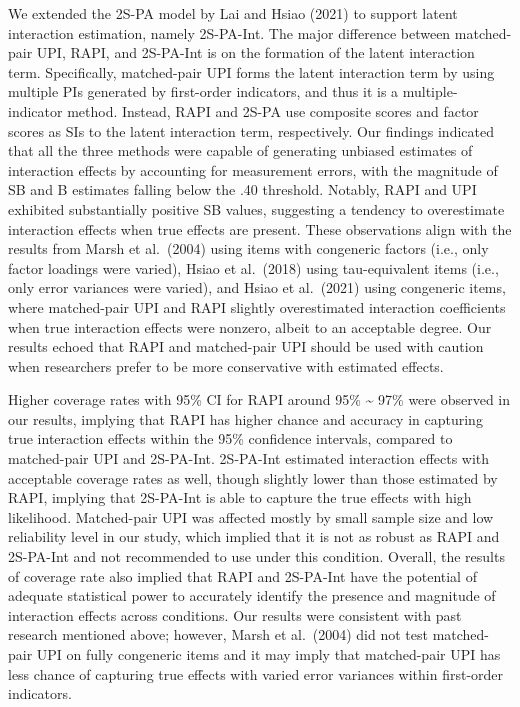 \documentclass[
  man]{apa6}
\begin{document}
We extended the 2S-PA model by Lai and Hsiao (2021) to support latent interaction estimation, namely 2S-PA-Int.
The major difference between matched-pair UPI, RAPI, and 2S-PA-Int is on the formation of the latent interaction term. Specifically, matched-pair UPI forms the latent interaction term by using multiple PIs generated by first-order indicators, and thus it is a multiple-indicator method. Instead, RAPI and 2S-PA use composite scores and factor scores as SIs to the latent interaction term, respectively. Our findings indicated that all the three methods were capable of generating unbiased estimates of interaction effects by accounting for measurement errors, with the magnitude of SB and B estimates falling below the .40 threshold. Notably, RAPI and UPI exhibited substantially positive SB values, suggesting a tendency to overestimate interaction effects when true effects are present. These observations align with the results from Marsh et al.~(2004) using items with congeneric factors (i.e., only factor loadings were varied), Hsiao et al.~(2018) using tau-equivalent items (i.e., only error variances were varied), and Hsiao et al.~(2021) using congeneric items, where matched-pair UPI and RAPI slightly overestimated interaction coefficients when true interaction effects were nonzero, albeit to an acceptable degree. Our results echoed that RAPI and matched-pair UPI should be used with caution when researchers prefer to be more conservative with estimated effects.

Higher coverage rates with 95\% CI for RAPI around 95\% \textasciitilde{} 97\% were observed in our results, implying that RAPI has higher chance and accuracy in capturing true interaction effects within the 95\% confidence intervals, compared to matched-pair UPI and 2S-PA-Int. 2S-PA-Int estimated interaction effects with acceptable coverage rates as well, though slightly lower than those estimated by RAPI, implying that 2S-PA-Int is able to capture the true effects with high likelihood. Matched-pair UPI was affected mostly by small sample size and low reliability level in our study, which implied that it is not as robust as RAPI and 2S-PA-Int and not recommended to use under this condition. Overall, the results of coverage rate also implied that RAPI and 2S-PA-Int have the potential of adequate statistical power to accurately identify the presence and magnitude of interaction effects across conditions. Our results were consistent with past research mentioned above; however, Marsh et al.~(2004) did not test matched-pair UPI on fully congeneric items and it may imply that matched-pair UPI has less chance of capturing true effects with varied error variances within first-order indicators.
\end{document}
